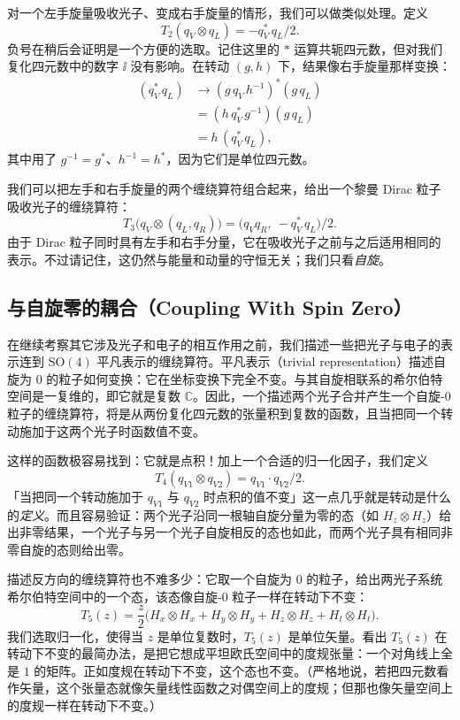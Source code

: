 对一个左手旋量吸收光子、变成右手旋量的情形，我们可以做类似处理。定义
\begin{equation*}
T_2(q_V\otimes q_L)=-q_V^*\,q_L/2 .
\end{equation*}
负号在稍后会证明是一个方便的选取。记住这里的 $*$ 运算共轭四元数，但对我们复化四元数中的数字 $\ii$ 没有影响。在转动 $(g,h)$ 下，结果像右手旋量那样变换：
\begin{align*}
(q_V^*\,q_L) &\to (g\,q_V\,h^{-1})^*(g\,q_L)\\
&= (h\,q_V^*\,g^{-1})(g\,q_L)\\
&= h\,(q_V^*\,q_L),
\end{align*}
其中用了 $g^{-1}=g^*$、$h^{-1}=h^*$，因为它们是单位四元数。

我们可以把左手和右手旋量的两个缠绕算符组合起来，给出一个黎曼 Dirac 粒子吸收光子的缠绕算符：
\begin{equation*}
T_3\bigl(q_V\otimes(q_L,q_R)\bigr)=\bigl(q_V q_R,\ -q_V^*\,q_L\bigr)/2 .
\end{equation*}
由于 Dirac 粒子同时具有左手和右手分量，它在吸收光子之前与之后适用相同的表示。不过请记住，这仍然与能量和动量的守恒无关；我们只看\emph{自旋}。

\subsection{与自旋零的耦合（Coupling With Spin Zero）}

在继续考察其它涉及光子和电子的相互作用之前，我们描述一些把光子与电子的表示连到 $\mathrm{SO}(4)$ 平凡表示的缠绕算符。平凡表示（trivial representation）描述自旋为 0 的粒子如何变换：它在坐标变换下完全不变。与其自旋相联系的希尔伯特空间是一复维的，即它就是复数 $\mathbb{C}$。因此，一个描述两个光子合并产生一个自旋-0 粒子的缠绕算符，将是从两份复化四元数的张量积到复数的函数，且当把同一个转动施加于这两个光子时函数值不变。

这样的函数极容易找到：它就是点积！加上一个合适的归一化因子，我们定义
\begin{equation*}
T_4(q_{V1}\otimes q_{V2})=q_{V1}\cdot q_{V2}/2 .
\end{equation*}
「当把同一个转动施加于 $q_{V1}$ 与 $q_{V2}$ 时点积的值不变」这一点几乎就是转动是什么的\emph{定义}。而且容易验证：两个光子沿同一根轴自旋分量为零的态（如 $H_z\otimes H_z$）给出非零结果，一个光子与另一个光子自旋相反的态也如此，而两个光子具有相同非零自旋的态则给出零。

描述反方向的缠绕算符也不难多少：它取一个自旋为 0 的粒子，给出两光子系统希尔伯特空间中的一个态，该态像自旋-0 粒子一样在转动下不变：
\begin{equation*}
T_5(z)=\frac{z}{2}\bigl(H_x\otimes H_x+H_y\otimes H_y+H_z\otimes H_z+H_t\otimes H_t\bigr).
\end{equation*}
我们选取归一化，使得当 $z$ 是单位复数时，$T_5(z)$ 是单位矢量。看出 $T_5(z)$ 在转动下不变的最简办法，是把它想成平坦欧氏空间中的度规张量：一个对角线上全是 $1$ 的矩阵。正如度规在转动下不变，这个态也不变。（严格地说，若把四元数看作矢量，这个张量态就像矢量线性函数之对偶空间上的度规；但那也像矢量空间上的度规一样在转动下不变。）

